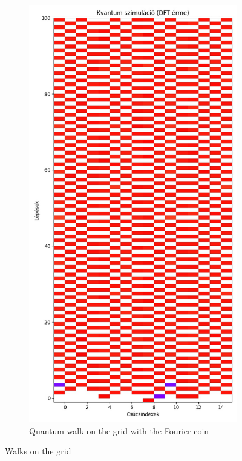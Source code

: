\begin{figure}[H]
\begin{subfigure}{.45\linewidth}
  \end{subfigure}
  \begin{subfigure}{.45\linewidth}
    \centering
    \includegraphics[width=\linewidth]{./figures/results/grid/dft.jpg}
    \caption{Quantum walk on the grid with the Fourier coin}
  \end{subfigure}
  \caption{Walks on the grid}
\end{figure}


